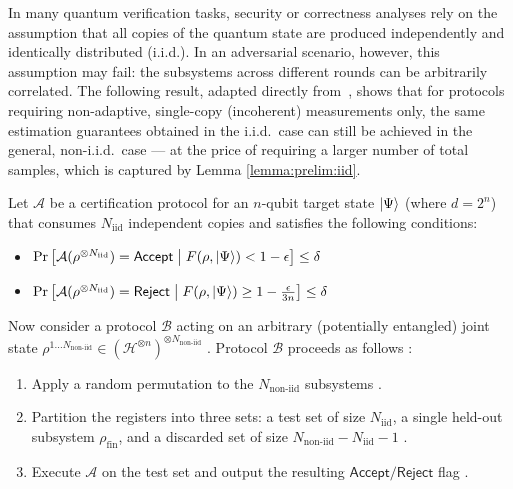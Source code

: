 \documentclass[a4paper,twocolumn,11pt,unpublished]{quantumarticle}
\newcommand{\Accept}{\mathsf{Accept}}
\newcommand{\Reject}{\mathsf{Reject}}
\newcommand{\Niid}{N_{\mathrm{iid}}}
\newcommand{\Nnoniid}{N_{\mathrm{non\text{-}iid}}}
\begin{document}
In many quantum verification tasks, security or correctness analyses rely on the assumption that all copies of the quantum state are produced independently and identically distributed (i.i.d.).
In an adversarial scenario, however, this assumption may fail: the subsystems across different rounds can be arbitrarily correlated.
The following result, adapted directly from~\cite[Theorem~3]{FKMO24learning}, shows that for protocols requiring non-adaptive, single-copy (incoherent) measurements only, the same estimation guarantees obtained in the i.i.d.\ case can still be achieved in the general, non-i.i.d.\ case — at the price of requiring a larger number of total samples, which is captured by Lemma \ref{lemma:prelim:iid}.
\begin{lemma}
\label{lemma:prelim:iid}
Let $\mathcal{A}$ be a certification protocol for an $n$-qubit target state $\ket{\Psi}$ (where $d=2^n$) that consumes $\Niid$ independent copies and satisfies the following conditions:

\begin{itemize}
    \item 
    $\Pr\left[\mathcal{A}(\rho^{\otimes \Niid}) = \Accept \; \middle|\;  F(\rho, \ket{\Psi}) < 1-\epsilon\right] \leq \delta$
    \item 
    $\Pr\left[\mathcal{A}(\rho^{\otimes \Niid}) = \Reject \; \middle|\;  F(\rho, \ket{\Psi}) \geq 1-\frac{\epsilon}{3n}\right] \leq \delta$ 
\end{itemize}

Now consider a protocol $\mathcal{B}$ acting on an arbitrary (potentially entangled) joint state $\rho^{1\ldots \Nnoniid} \in (\mathcal{H}^{\otimes n})^{\otimes \Nnoniid}$ . Protocol $\mathcal{B}$ proceeds as follows :
\begin{enumerate}
    \item Apply a random permutation to the $\Nnoniid$ subsystems .
    \item Partition the registers into three sets: a test set of size $\Niid$, a single held-out subsystem $\rho_{\mathrm{fin}}$, and a discarded set of size $\Nnoniid - \Niid - 1$ .
    \item Execute $\mathcal{A}$ on the test set and output the resulting $\Accept/\Reject$ flag .
\end{enumerate}


\end{lemma}
\end{document}
